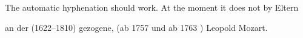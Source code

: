 \documentclass{article}
\begin{document}
{The automatic hyphenation should work.
At the moment it does not by Eltern}


\noindent
an der 
(1622–1810)  gezogene,  (ab 1757  und ab 1763
) Leopold Mozart.


\end{document}
